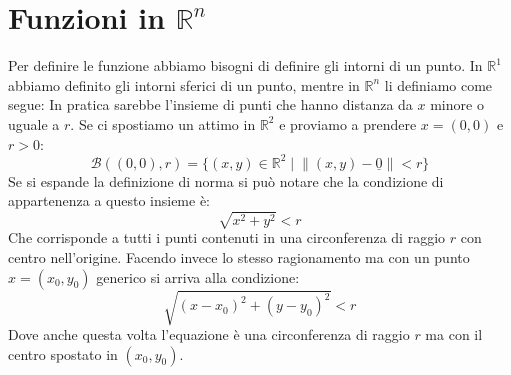 \section{Funzioni in $\mathbb{R}^n$}
Per definire le funzione abbiamo bisogni di definire gli intorni di un punto. In $\mathbb{R}^1$ abbiamo definito gli intorni sferici di un punto, mentre in $\mathbb{R}^n$ li definiamo come segue:
In pratica sarebbe l'insieme di punti che hanno distanza da $x$ minore o uguale a $r$. Se ci spostiamo un attimo in $\mathbb{R}^2$ e proviamo a prendere $x = (0, 0)$ e $r > 0$:
\begin{equation*}
	\mathcal{B}((0, 0), r) = \{(x, y) \in \mathbb{R}^2 \; | \; \lVert (x, y) - \underline{0} \rVert < r\}
\end{equation*}
Se si espande la definizione di norma si può notare che la condizione di appartenenza a questo insieme è:
\begin{equation*}
	\sqrt{x^2 + y^2} < r
\end{equation*}
Che corrisponde a tutti i punti contenuti in una circonferenza di raggio $r$ con centro nell'origine. Facendo invece lo stesso ragionamento ma con un punto $x = (x_0, y_0)$ generico si arriva alla condizione:
\begin{equation*}
	\sqrt{(x - x_0)^2 + (y - y_0)^2} < r
\end{equation*}
Dove anche questa volta l'equazione è una circonferenza di raggio $r$ ma con il centro spostato in $(x_0, y_0)$.


